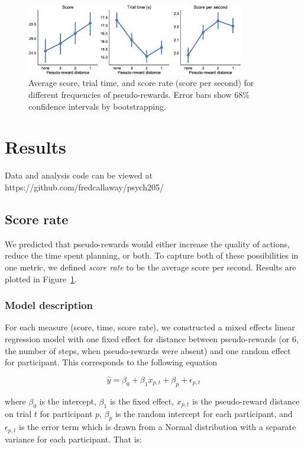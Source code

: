 \documentclass[10pt,letterpaper]{article}
\begin{document}
\begin{figure}[t!]
    \centering
    \includegraphics[width=0.85\textwidth]{figs/basic.eps}
    \caption{Average score, trial time, and score rate (score per second) for different frequencies of pseudo-rewards. Error bars show 68\% confidence intervals by bootstrapping.}
    \label{fig:basic}
\end{figure}

\section{Results}\label{results}

Data and analysis code can be viewed at https://github.com/fredcallaway/psych205/

\subsection{Score rate}
We predicted that pseudo-rewards would either increase the quality of actions, reduce the time spent planning, or both. To capture both of these possibilities in one metric, we defined \emph{score rate} to be the average score per second. Results are plotted in Figure~\ref{fig:basic}.

\subsubsection{Model description}
For each measure (score, time, score rate), we constructed a mixed effects linear regression model with one fixed effect for distance between pseudo-rewards (or 6, the number of steps, when pseudo-rewards were absent) and one random effect for participant. This corresponds to the following equation

\begin{equation}
    \hat{y} = \beta_0 + \beta_1 x_{p,t} + \beta_p + \epsilon_{p,t}
\end{equation}

where $\beta_0$ is the intercept, $\beta_1$ is the fixed effect, $x_{p,t}$ is the pseudo-reward distance on trial $t$ for participant $p$, $\beta_p$ is the random intercept for each participant, and $\epsilon_{p,t}$ is the error term which is drawn from a Normal distribution with a separate variance for each participant. That is:
\end{document}
